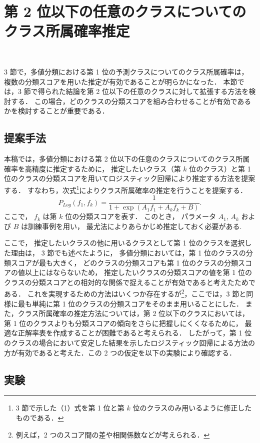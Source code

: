 \documentclass[japanese]{jnlp_1.4}
\begin{document}
\section{第 2 位以下の任意のクラスについてのクラス所属確率推定}\

3 節で，多値分類における第 1 位の予測クラスについてのクラス所属確率は，
複数の分類スコアを用いた推定が有効であることが明らかになった．
本節では，3 節で得られた結論を第 2 位以下の任意のクラスに対して拡張する方法を検討する．
この場合，どのクラスの分類スコアを組み合わせることが有効であるかを検討することが重要である．

\subsection{提案手法}

本稿では，多値分類における第 2 位以下の任意のクラスについてのクラス所属確率を高精度に推定するために，
推定したいクラス（第 $k$ 位のクラス）と第 1 位のクラスの分類スコアを用いてロジスティック回帰により推定する方法を提案する．
すなわち，次式\footnote{
	3 節で示した（1）式を第 1 位と第 $k$ 位のクラスのみ用いるように修正したものである．
}によりクラス所属確率の推定を行うことを提案する．
\begin{equation}
 P_{Log}( f_{1},f_{k}) = \frac{1}{1+\exp (A_{1}f_{1}+A_{k}f_{k}+B)}.
\end{equation}
ここで，
$f_{k}$ は第 $k$ 位の分類スコアを表す．
このとき，
パラメータ $A_{1}$, $A_{k}$ および $B$ は訓練事例を用い，
最尤法によりあらかじめ推定しておく必要がある.

ここで，
推定したいクラスの他に用いるクラスとして第 1 位のクラスを選択した理由は，
3 節でも述べたように，
多値分類においては，第 1 位のクラスの分類スコアが最も大きく，
どのクラスの分類スコアも第 1 位のクラスの分類スコアの値以上にはならないため，
推定したいクラスの分類スコアの値を第 1 位のクラスの分類スコアとの相対的な関係で捉えることが有効であると考えたためである．
これを実現するための方法はいくつか存在するが\footnote{
	例えば，2 つのスコア間の差や相関係数などが考えられる．
}，ここでは，3 節と同様に最も単純に第 1 位のクラスの分類スコアをそのまま用いることにした．
また，クラス所属確率の推定方法については，第 2 位以下のクラスにおいては，
第 1 位のクラスよりも分類スコアの傾向をさらに把握しにくくなるために，
最適な正解率表を作成することが困難であると考えられる．
したがって，第 1 位のクラスの場合において安定した結果を示したロジスティック回帰による方法の方が有効であると考えた．この 2 つの仮定を以下の実験により確認する．

\subsection{実験}
\end{document}
